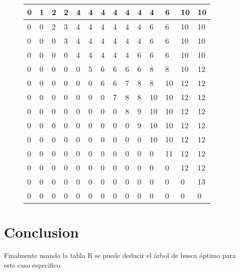 \documentclass{article}
\begin{document}
\centering 
\begin{figure}[H]
\label{my-label2}
\begin{tabular}{|l|l|l|l|l|l|l|l|l|l|l|l|l|l|}
\hline
0& 1& 2& 2& 4& 4& 4& 4& 4& 4& 4& 6& 10& 10\\ \hline
0& 0& 2& 3& 4& 4& 4& 4& 4& 4& 6& 6& 10& 10\\ \hline
0& 0& 0& 3& 4& 4& 4& 4& 4& 4& 6& 6& 10& 10\\ \hline
0& 0& 0& 0& 4& 4& 4& 4& 4& 6& 6& 6& 10& 10\\ \hline
0& 0& 0& 0& 0& 5& 6& 6& 6& 6& 8& 8& 10& 12\\ \hline
0& 0& 0& 0& 0& 0& 6& 6& 7& 8& 8& 10& 12& 12\\ \hline
0& 0& 0& 0& 0& 0& 0& 7& 8& 8& 10& 10& 12& 12\\ \hline
0& 0& 0& 0& 0& 0& 0& 0& 8& 9& 10& 10& 12& 12\\ \hline
0& 0& 0& 0& 0& 0& 0& 0& 0& 9& 10& 10& 12& 12\\ \hline
0& 0& 0& 0& 0& 0& 0& 0& 0& 0& 10& 10& 12& 12\\ \hline
0& 0& 0& 0& 0& 0& 0& 0& 0& 0& 0& 11& 12& 12\\ \hline
0& 0& 0& 0& 0& 0& 0& 0& 0& 0& 0& 0& 12& 12\\ \hline
0& 0& 0& 0& 0& 0& 0& 0& 0& 0& 0& 0& 0& 13\\ \hline
0& 0& 0& 0& 0& 0& 0& 0& 0& 0& 0& 0& 0& 0\\ \hline
\end{tabular}
\end{figure}
    
    

\section{Conclusion}
Finalmente usando la tabla R se puede deducir el árbol de busca óptimo para este caso especifico.
\end{document}
